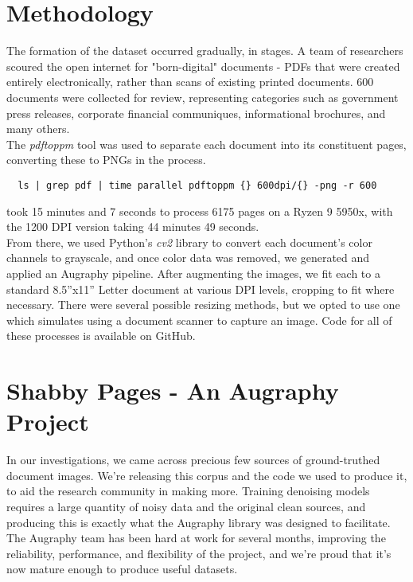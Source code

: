\documentclass[runningheads]{llncs}
\begin{document}
\section{Methodology}
The formation of the dataset occurred gradually, in stages. A team of researchers scoured the open internet for "born-digital" documents - PDFs that were created entirely electronically, rather than scans of existing printed documents. 600 documents were collected for review, representing categories such as government press releases, corporate financial communiques, informational brochures, and many others.\\

The \textit{pdftoppm} tool was used to separate each document into its constituent pages, converting these to PNGs in the process.

\begin{lstlisting}
  ls | grep pdf | time parallel pdftoppm {} 600dpi/{} -png -r 600
\end{lstlisting}

took 15 minutes and 7 seconds to process 6175 pages on a Ryzen 9 5950x, with the 1200 DPI version taking 44 minutes 49 seconds.\\

From there, we used Python's \textit{cv2} library to convert each document's color channels to grayscale, and once color data was removed, we generated and applied an Augraphy pipeline. After augmenting the images, we fit each to a standard 8.5''x11'' Letter document at various DPI levels, cropping to fit where necessary. There were several possible resizing methods, but we opted to use one which simulates using a document scanner to capture an image. Code for all of these processes is available on GitHub.

\section{Shabby Pages - An Augraphy Project}
In our investigations, we came across precious few sources of ground-truthed document images. We're releasing this corpus and the code we used to produce it, to aid the research community in making more. Training denoising models requires a large quantity of noisy data and the original clean sources, and producing this is exactly what the Augraphy library was designed to facilitate. The Augraphy team has been hard at work for several months, improving the reliability, performance, and flexibility of the project, and we're proud that it's now mature enough to produce useful datasets.\\
\end{document}
